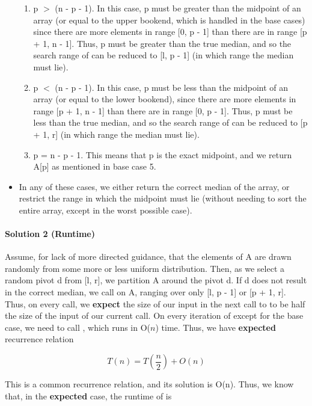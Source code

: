 \documentclass[11pt]{article}
\begin{document}
\begin{itemize}
\begin{enumerate}
        \item p $>$ (n - p - 1). In this case, p must be greater than the midpoint of an array (or equal to the upper bookend, which is handled in the base cases) since there are more elements in range [0, p - 1] than there are in range [p + 1, n - 1]. Thus, p must be greater than the true median, and so the search range of  can be reduced to [l, p - 1] (in which range the median must lie).
        \item p $<$ (n - p - 1). In this case, p must be less than the midpoint of an array (or equal to the lower bookend), since there are more elements in range [p + 1, n - 1] than there are in range [0, p - 1]. Thus, p must be less than the true median, and so the search range of  can be reduced to [p + 1, r] (in which range the median must lie).
        \item p = n - p - 1. This means that p is the exact midpoint, and we return A[p] as mentioned in base case 5.
    \end{enumerate}
    \item In any of these cases, we either return the correct median of the array, or restrict the range in which the midpoint must lie (without needing to sort the entire array, except in the worst possible case).
\end{itemize}

\paragraph{Solution 2 (Runtime)}

Assume, for lack of more directed guidance, that the elements of A are drawn randomly from some more or less uniform distribution. Then, as we select a random pivot d from [l, r], we partition A around the pivot d. If d does not result in the correct median, we call  on A, ranging over only [l, p - 1] or [p + 1, r]. Thus, on every call, we \textbf{expect} the size of our input in the next call to  to be half the size of the input of our current call. On every iteration of  except for the base case, we need to call , which runs in O($n$) time. Thus, we have \textbf{expected} recurrence relation

\begin{equation*}
    T(n) = T \left ( \frac{n}{2} \right ) + O(n)
\end{equation*}

This is a common recurrence relation, and its solution is O(n). Thus, we know that, in the \textbf{expected} case, the runtime of  is
\end{document}
